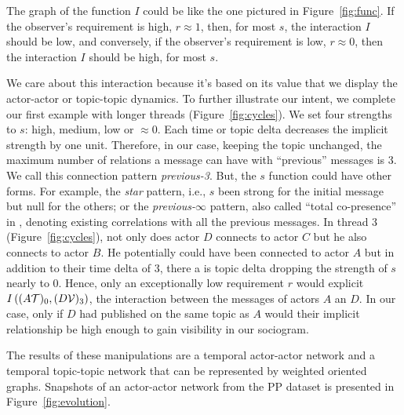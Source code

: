 \documentclass[a4paper,twoside]{article}
\newcommand{\V}{\mathcal{V}}
\begin{document}


The graph of the function $I$ could be like the one pictured in Figure~\ref{fig:func}.  If the observer's requirement is high, $r\approx{} 1$, then, for most $s$, the interaction $I$ should be low, and conversely, if the observer's requirement is low, $r\approx{} 0$, then the interaction $I$ should be high, for most $s$.

We care about this interaction because it's based on its value that we display the actor-actor or topic-topic dynamics.  To further illustrate our intent, we complete our first example with longer threads (Figure~\ref{fig:cycles}).  We set four strengths to $s$: high, medium, low or $\approx 0$.  Each time or topic delta decreases the implicit strength by one unit.  Therefore, in our case, keeping the topic unchanged, the maximum number of relations a message can have with ``previous'' messages is 3.  We call this connection pattern \emph{previous-3}.  But, the $s$ function could have other forms.  For example, the \emph{star} pattern, i.e., $s$ been strong for the initial message but null for the others; or the \emph{previous-}$\infty$ pattern, also called ``total co-presence'' in \cite{Wise2017}, denoting existing correlations with all the previous messages.
In thread 3 (Figure~\ref{fig:cycles}), not only does actor $D$ connects to actor $C$ but he also connects to actor $B$.  He potentially could have been connected to actor $A$ but in addition to their time delta of 3, there a is topic delta dropping the strength of $s$ nearly to 0.  Hence, only an exceptionally low requirement $r$ would explicit $I\left ((A\T)_0,(D\V)_3 \right )$, the interaction between the messages of actors $A$ an $D$.   In our case, only if $D$ had published on the same topic as $A$ would their implicit relationship be high enough to gain visibility in our sociogram.

The results of these manipulations are a temporal actor-actor network and a temporal topic-topic network that can be represented by weighted oriented graphs.  Snapshots of an actor-actor network from the PP dataset is presented in Figure~\ref{fig:evolution}.
\end{document}
